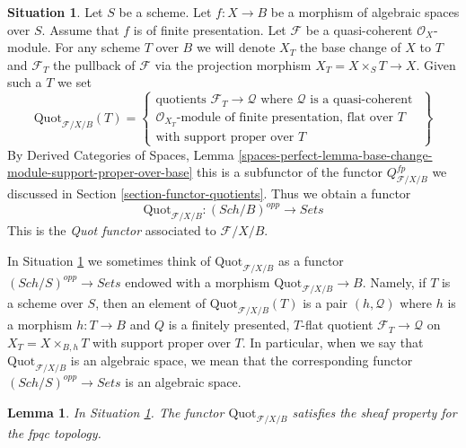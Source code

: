 \documentclass{stacks-project}
\theoremstyle{plain}
\newtheorem{lemma}[subsection]{Lemma}
\theoremstyle{definition}
\newtheorem{situation}[subsection]{Situation}
\theoremstyle{remark}
\numberwithin{equation}{subsection}
\def\Sch{\mathit{Sch}}
\def\Quotfunctor{\mathrm{Quot}}
\begin{document}
\begin{situation}
\label{situation-quot}
Let $S$ be a scheme. Let $f : X \to B$ be a morphism of
algebraic spaces over $S$. Assume that $f$ is of finite presentation.
Let $\mathcal{F}$ be a quasi-coherent $\mathcal{O}_X$-module.
For any scheme $T$ over $B$ we will denote $X_T$ the base change of
$X$ to $T$ and $\mathcal{F}_T$ the pullback
of $\mathcal{F}$ via the projection morphism $X_T = X \times_S T \to X$.
Given such a $T$ we set
$$
\Quotfunctor_{\mathcal{F}/X/B}(T) =
\left\{
\begin{matrix}
\text{quotients }\mathcal{F}_T \to \mathcal{Q}\text{ where }
\mathcal{Q}\text{ is a quasi-coherent }\\
\mathcal{O}_{X_T}\text{-module of finite presentation, flat over }T\\
\text{with support proper over }T
\end{matrix}
\right\}
$$
By Derived Categories of Spaces, Lemma
\ref{spaces-perfect-lemma-base-change-module-support-proper-over-base}
this is a subfunctor of the functor $Q^{fp}_{\mathcal{F}/X/B}$
we discussed in Section \ref{section-functor-quotients}.
Thus we obtain a functor
\begin{equation}
\label{equation-quot}
\Quotfunctor_{\mathcal{F}/X/B} : (\Sch/B)^{opp} \longrightarrow \textit{Sets}
\end{equation}
This is the {\it Quot functor} associated to $\mathcal{F}/X/B$.
\end{situation}

\noindent
In Situation \ref{situation-quot} we sometimes think of
$\Quotfunctor_{\mathcal{F}/X/B}$ as a functor
$(\Sch/S)^{opp} \to \textit{Sets}$ endowed
with a morphism $\Quotfunctor_{\mathcal{F}/X/B} \to B$.
Namely, if $T$ is a scheme over $S$, then an element
of $\Quotfunctor_{\mathcal{F}/X/B}(T)$ is a pair $(h, \mathcal{Q})$
where $h$ is a morphism $h : T \to B$
and $Q$ is a finitely presented, $T$-flat quotient
$\mathcal{F}_T \to \mathcal{Q}$ on $X_T = X \times_{B, h} T$
with support proper over $T$. In particular, when we say
that $\Quotfunctor_{\mathcal{F}/X/B}$ is an algebraic space, we mean that the
corresponding functor $(\Sch/S)^{opp} \to \textit{Sets}$ is an algebraic space.

\begin{lemma}
\label{lemma-quot-sheaf}
In Situation \ref{situation-quot}. The functor $\Quotfunctor_{\mathcal{F}/X/B}$
satisfies the sheaf property for the fpqc topology.
\end{lemma}
\end{document}
